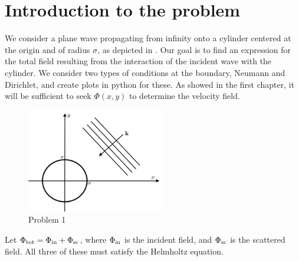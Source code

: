 %
\section{Introduction to the problem}
We consider a plane wave propagating from infinity onto a cylinder centered at the origin and of radius $\sigma$, as depicted in . Our goal is to find an expression for the total field resulting from the interaction of the incident wave with the cylinder. We consider two types of conditions at the boundary, Neumann and Dirichlet, and create plots in python for these. As showed in the first chapter, it will be sufficient to seek $\Phi(x, y)$ to determine the velocity field.\par
%
    \begin{figure}
        \centering
        \includegraphics[width=6cm]{../figures/sk_problem_1.png}
        \caption{Problem 1}
        \label{fig:problem_1}
    \end{figure}
%
Let $\Phi_{\text{tot}} = \Phi_{\text{in}} + \Phi_{\text{sc}}$, where $\Phi_{\text{in}}$ is the incident field, and $\Phi_{\text{sc}}$ is the scattered field. All three of these must satisfy the Helmholtz equation.
